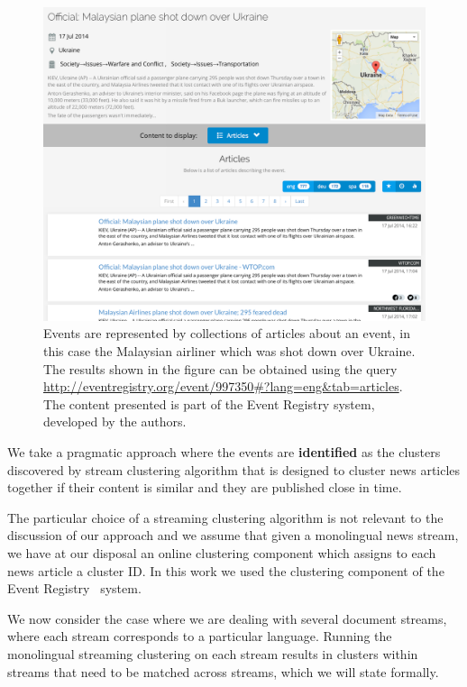 \begin{figure}
\centering
\includegraphics[width=1\textwidth]{figures/events2.png}
\caption{\label{fig:event2} Events are represented by collections of articles about an event, in 
this case the Malaysian airliner which was shot down over Ukraine. The results shown in the figure can be obtained using the query \url{http://eventregistry.org/event/997350\#?lang=eng\&tab=articles}. The 
content presented is part of the Event Registry system, developed by the authors.}
\end{figure}


We take a pragmatic approach where the events are \textbf{identified} as the clusters
discovered by stream clustering algorithm that is designed to cluster
news articles together if their content is similar and they are published
close in time. 

The particular choice of a streaming clustering algorithm is not relevant
to the discussion of our approach and we assume that given a monolingual news stream, we have
at our disposal an online clustering component which assigns to each news
article a cluster ID. In this work we used the clustering
component of the Event Registry~\cite{Leban2014W,Leban2014I} system.

We now consider the case where we are dealing with several document streams, where each
stream corresponds to a particular language. Running the monolingual streaming clustering
on each stream results in clusters within streams that need to be matched across streams,
which we will state formally.


